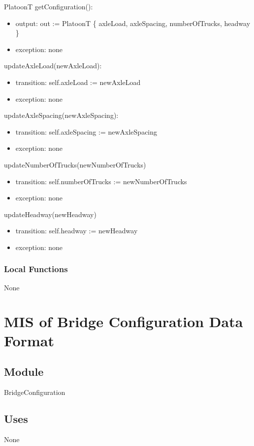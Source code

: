 \documentclass[12pt, titlepage]{article}
\begin{document}
\noindent PlatoonT getConfiguration():
\begin{itemize}
\item output: out := PlatoonT \{ axleLoad, axleSpacing, numberOfTrucks, headway \} 
\item exception: none
\end{itemize}

\noindent updateAxleLoad(newAxleLoad):
\begin{itemize}
\item transition: self.axleLoad := newAxleLoad
\item exception: none
\end{itemize}

\noindent updateAxleSpacing(newAxleSpacing):
\begin{itemize}
\item transition: self.axleSpacing := newAxleSpacing
\item exception: none
\end{itemize}

\noindent updateNumberOfTrucks(newNumberOfTrucks)
\begin{itemize}
\item transition: self.numberOfTrucks := newNumberOfTrucks
\item exception: none
\end{itemize}

\noindent updateHeadway(newHeadway)
\begin{itemize}
\item transition: self.headway := newHeadway
\item exception: none
\end{itemize}

\subsubsection{Local Functions}
None
\newpage

\section{MIS of Bridge Configuration Data Format} \label{BridgeConfiguration} 

\subsection{Module}

BridgeConfiguration

\subsection{Uses}
None
\end{document}
